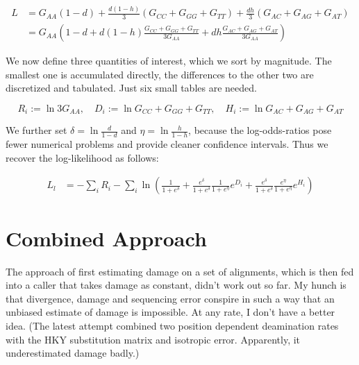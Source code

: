 \documentclass{article}
\begin{document}
\begin{align*}
L &= G_{AA} \left( 1-d \right) + \frac{d(1-h)}{3} \left( G_{CC} + G_{GG} + G_{TT} \right)
          + \frac{dh}{3} \left( G_{AC} + G_{AG} + G_{AT} \right) \\
  &= G_{AA} \left( 1-d + d(1-h) \frac{G_{CC} + G_{GG} + G_{TT}}{3 G_{AA}}
          + dh \frac{G_{AC} + G_{AG} + G_{AT}}{3 G_{AA}} \right)
\end{align*}

We now define three quantities of interest, which we sort by magnitude.
The smallest one is accumulated directly, the differences to the other
two are discretized and tabulated.  Just six small tables are needed.

\begin{equation*}
R_i := \ln 3 G_{AA}, \quad
D_i := \ln G_{CC} + G_{GG} + G_{TT}, \quad
H_i := \ln G_{AC} + G_{AG} + G_{AT} 
\end{equation*}

We further set $\delta = \ln \frac{d}{1-d}$ and $\eta = \ln
\frac{h}{1-h}$, because the log-odds-ratios pose fewer numerical
problems and provide cleaner confidence intervals.  Thus we recover the
log-likelihood as follows:

\begin{align*}
L_l &= - \sum_{i} R_i - \sum_{i} \ln \left( \frac{1}{1+e^\delta} +
    \frac{e^\delta}{1+e^\delta} \frac{1}{1+e^\eta} e^{D_i} +
    \frac{e^\delta}{1+e^\delta} \frac{e^\eta}{1+e^\eta} e^{H_i} \right)
\end{align*}



\section{Combined Approach}

The approach of first estimating damage on a set of alignments, which is
then fed into a caller that takes damage as constant, didn't work out so
far.  My hunch is that divergence, damage and sequencing error conspire
in such a way that an unbiased estimate of damage is impossible.  At any
rate, I don't have a better idea.  (The latest attempt combined two
position dependent deamination rates with the HKY substitution matrix
and isotropic error.  Apparently, it underestimated damage badly.)
\end{document}
